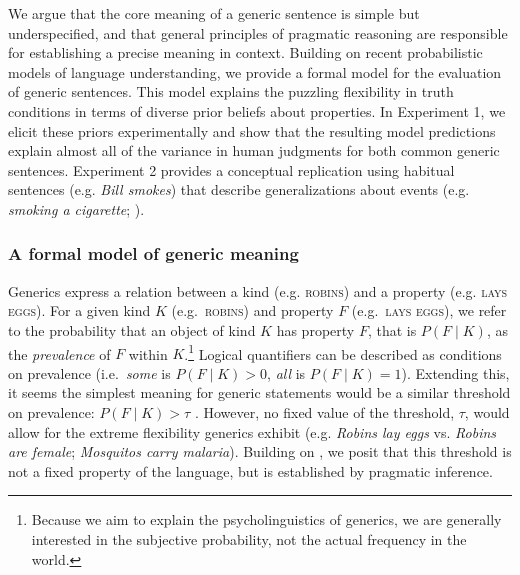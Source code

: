 \documentclass[11pt,letterpaper]{article}
\begin{document}
We argue that the core meaning of a generic sentence is simple but underspecified, and that general principles of pragmatic reasoning are responsible for establishing a precise meaning in context. 
Building on recent probabilistic models of language understanding, we provide a formal model for the evaluation of generic sentences. 
This model explains the puzzling flexibility in truth conditions in terms of diverse prior beliefs about properties.
In Experiment 1, we elicit these priors experimentally and show that the resulting model predictions explain almost all of the variance in human judgments for both common generic sentences.
Experiment 2 provides a conceptual replication using habitual sentences (e.g. \emph{Bill smokes}) that describe generalizations about events (e.g. \emph{smoking a cigarette}; ).

\subsubsection*{A formal model of generic meaning}

Generics express a relation between a kind (e.g. \textsc{robins}) and a property (e.g. \textsc{lays eggs}). 
For a given kind $K$ (e.g.~\textsc{robins}) and property $F$ (e.g.~\textsc{lays eggs}), we refer to the probability that an object of kind $K$ has property $F$, that is $P(F\mid K)$, as the \emph{prevalence} of $F$ within $K$.\footnote{Because we aim to explain the psycholinguistics of generics, we are generally interested in the subjective probability, not the actual frequency in the world.}
Logical quantifiers can be described as conditions on prevalence (i.e.~\emph{some} is $P(F\mid K)>0$, \emph{all} is $P(F\mid K)=1$). 
Extending this, it seems the simplest meaning for generic statements would be a similar threshold on prevalence: $P(F\mid K)>\tau$ \cite{Cohen1999}. 
However, no fixed value of the threshold, $\tau$, would allow for the extreme flexibility generics exhibit (e.g. \emph{Robins lay eggs} vs. \emph{Robins are female}; \emph{Mosquitos carry malaria}).
Building on , we posit that this threshold is not a fixed property of the language, but is established by pragmatic inference.
\end{document}
